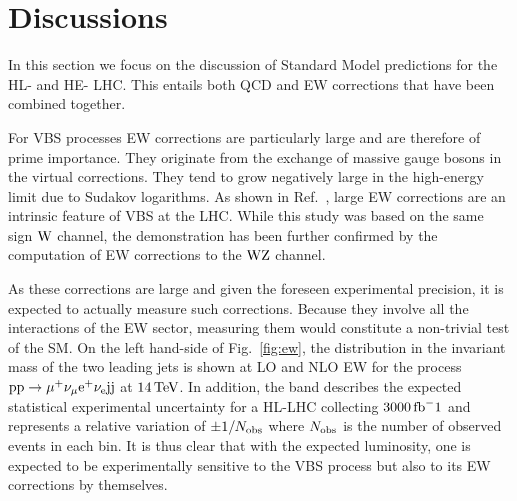 \documentclass[11pt,epsf]{article}
\begin{document}
\section{Discussions}


In this section we focus on the discussion of Standard Model predictions for the HL- and HE- LHC.
This entails both QCD and EW corrections that have been combined together.


For VBS processes EW corrections are particularly large \cite{Biedermann:2016yds} and are therefore of prime importance.
They originate from the exchange of massive gauge bosons in the virtual corrections.
They tend to grow negatively large in the high-energy limit due to Sudakov logarithms.
As shown in Ref.~\cite{Biedermann:2016yds}, large EW corrections are an intrinsic feature of VBS at the LHC.
While this study was based on the same sign $\text{W}$ channel, the demonstration has been further confirmed by the computation of EW corrections to the $\text{W}\text{Z}$ channel.

As these corrections are large and given the foreseen experimental precision, it is expected to actually measure such corrections.
Because they involve all the interactions of the EW sector, measuring them would constitute a non-trivial test of the SM.
On the left hand-side of Fig.~\ref{fig:ew}, the distribution in the invariant mass of the two leading jets is shown at LO and NLO EW for the process $\text{p}\text{p} \to \mu^+ \nu_{\mu} \text{e}^+ \nu_{\text{e}} \text{j}\text{j}$ at $14\,\text{TeV}$.
In addition, the band describes the expected statistical experimental uncertainty for a HL-LHC collecting $3000\fb^-1$ and represents a relative variation of $\pm1/N_{\rm obs}$ where $N_{\rm obs}$ is the number of observed events in each bin.
It is thus clear that with the expected luminosity, one is expected to be experimentally sensitive to the VBS process but also to its EW corrections by themselves.
\end{document}
